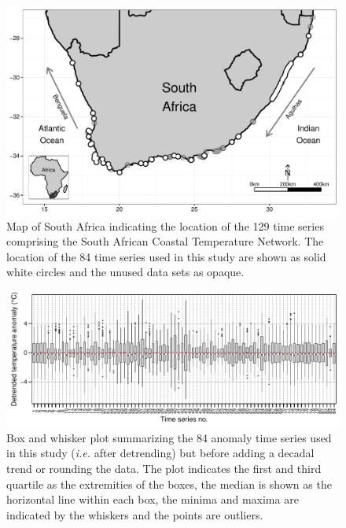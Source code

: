 \documentclass[]{ametsoc}
\begin{document}
%
\begin{figure}
\centering \includegraphics[width=1.0\textwidth]{figure01}
\caption{Map of South Africa indicating the location of the 129 time series comprising the South African Coastal Temperature Network. The location of the 84 time series used in this study are shown as solid white circles and the unused data sets as opaque.}
\label{figure01}
\end{figure}

\begin{figure}
\centering \includegraphics[width=1.0\textwidth]{figure02}
\caption{Box and whisker plot summarizing the 84 anomaly time series used in this study (\emph{i.e.} after detrending) but before adding a decadal trend or rounding the data. The plot indicates the first and third quartile as the extremities of the boxes, the median is shown as the horizontal line within each box, the minima and maxima are indicated by the whiskers and the points are outliers.}
\label{figure02}
\end{figure}
\end{document}
